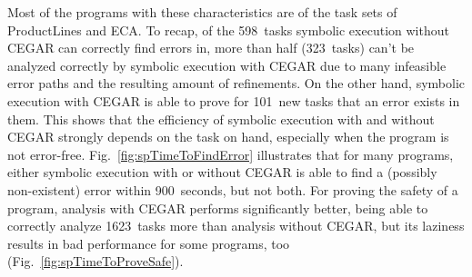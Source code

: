 Most of the programs with these characteristics are of the task sets of ProductLines and ECA.
To recap, of the 598~tasks symbolic execution without CEGAR can correctly find errors in, more than half (323~tasks) can't be analyzed correctly by symbolic execution with CEGAR
due to many infeasible error paths and the resulting amount of refinements.
On the other hand, symbolic execution with CEGAR is able to prove for 101~new tasks that an error exists in them.
This shows that the efficiency of symbolic execution with and without CEGAR strongly depends on the task on hand, especially when the program is not error-free.
Fig.~\ref{fig:spTimeToFindError} illustrates that for many programs, either symbolic execution with or without CEGAR is able to find a (possibly non-existent) error within 900~seconds, but not both.
For proving the safety of a program, analysis with CEGAR performs significantly better, being able to correctly analyze 1623~tasks more than analysis without CEGAR, but its laziness results in bad performance for some programs, too (Fig.~\ref{fig:spTimeToProveSafe}).

